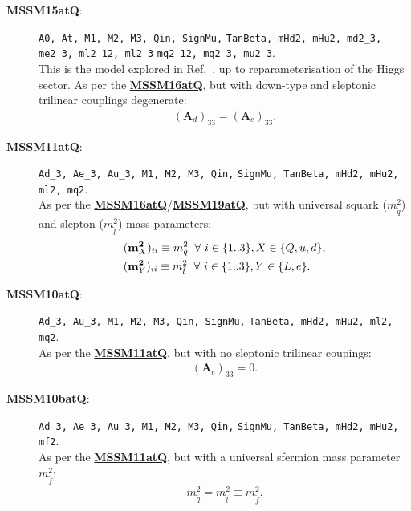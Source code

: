 \documentclass[pdftex,twocolumn,epjc3_preprint,runningheads]{svjour3}
\renewcommand{\_}{\discretionary{\underscore}{}{\underscore}}
\newcommand\term[1]{{\lstset{style=terminal}\lstinline!#1!\lstset{style=cpp}}}
\newcommand{\doublecrosssf}[2]{\hyperref[#2]{\textbf{\textsf{#1}}}}
\newcommand{\gsfitemc}[1]{\item[\textbf{\textsf{#1}}\label{#1}:]}
\begin{document}
\begin{description}
\gsfitemc{MSSM15atQ} \term{A0, At, M1, M2, M3, Qin, SignMu,}
                     \term{TanBeta, mHd2, mHu2, md2_3, me2_3, ml2_12, ml2_3}
                     \term{mq2_12, mq2_3, mu2_3}.\\
This is the model explored in Ref.\ \cite{Strege15}, up to reparameterisation of the Higgs sector.  As per the \doublecrosssf{MSSM16atQ}{MSSM16atQ}, but with down-type and sleptonic trilinear couplings degenerate:
\begin{align}
(\mathbf{A}_d)_{33} = (\mathbf{A}_e)_{33}.
\end{align}

\gsfitemc{MSSM11atQ} \term{Ad_3, Ae_3, Au_3, M1, M2, M3, Qin,}
                     \term{SignMu, TanBeta, mHd2, mHu2, ml2, mq2}.\\
As per the \doublecrosssf{MSSM16atQ}{MSSM16atQ}/\doublecrosssf{MSSM19atQ}{MSSM19atQ}, but with universal squark ($m_{\tilde q}^2$) and slepton ($m_{\tilde l}^2$) mass parameters:
\begin{align}
&(\mathbf{m}^\mathbf{2}_X)_{ii} \equiv m_{\tilde q}^2 \hspace{2mm}\forall\ i\in\{1..3\}, X\in\{Q,u,d\},\\
&(\mathbf{m}^\mathbf{2}_Y)_{ii} \equiv m_{\tilde l}^2 \hspace{2mm}\forall\ i\in\{1..3\}, Y\in\{L,e\}.
\end{align}

\gsfitemc{MSSM10atQ} \term{Ad_3, Au_3, M1, M2, M3, Qin, SignMu,}
                     \term{TanBeta, mHd2, mHu2, ml2, mq2}.\\
As per the \doublecrosssf{MSSM11atQ}{MSSM11atQ}, but with no sleptonic trilinear coupings:
\begin{align}
(\mathbf{A}_e)_{33} = 0.
\end{align}

\gsfitemc{MSSM10batQ} \term{Ad_3, Ae_3, Au_3, M1, M2, M3, Qin,}
                      \term{SignMu, TanBeta, mHd2, mHu2, mf2}.\\
As per the \doublecrosssf{MSSM11atQ}{MSSM11atQ}, but with a universal sfermion mass parameter $m_{\tilde f}^2$:
\begin{align}
m_{\tilde q}^2 = m_{\tilde l}^2 \equiv m_{\tilde f}^2.
\end{align}


\end{description}
\end{document}
